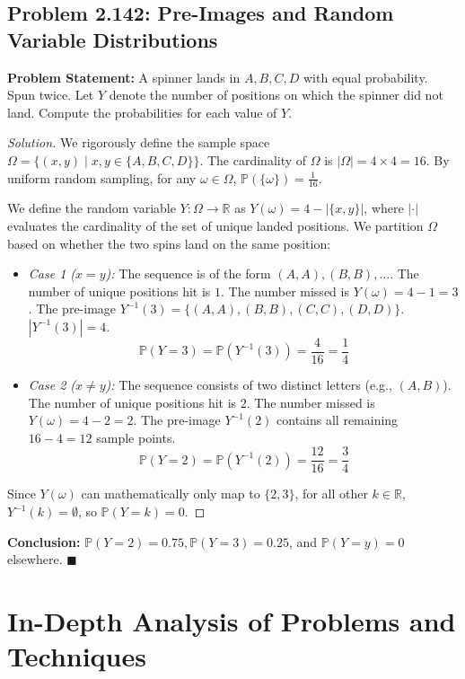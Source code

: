 \documentclass[11pt]{article}
\theoremstyle{definition}
\theoremstyle{plain}
\theoremstyle{remark}
\newcommand{\R}{\mathbb{R}}
\renewcommand{\P}{\mathbb{P}}
\newcommand{\1}{\mathbf{1}}
\begin{document}
\subsection{Problem 2.142: Pre-Images and Random Variable Distributions}
\textbf{Problem Statement:}
A spinner lands in $A, B, C, D$ with equal probability. Spun twice. Let $Y$ denote the number of positions on which the spinner did not land. Compute the probabilities for each value of $Y$.

\begin{proof}[Solution]
We rigorously define the sample space $\Omega = \{ (x, y) \mid x, y \in \{A, B, C, D\} \}$. 
The cardinality of $\Omega$ is $|\Omega| = 4 \times 4 = 16$. 
By uniform random sampling, for any $\omega \in \Omega$, $\P(\{\omega\}) = \frac{1}{16}$.

We define the random variable $Y: \Omega \to \R$ as $Y(\omega) = 4 - |\{x, y\}|$, where $|\cdot|$ evaluates the cardinality of the set of unique landed positions.
We partition $\Omega$ based on whether the two spins land on the same position:
\begin{itemize}
    \item \textit{Case 1 ($x=y$):} The sequence is of the form $(A,A), (B,B), \dots$. The number of unique positions hit is $1$. The number missed is $Y(\omega) = 4 - 1 = 3$. 
    The pre-image $Y^{-1}(3) = \{ (A,A), (B,B), (C,C), (D,D) \}$.
    $|Y^{-1}(3)| = 4$.
    \[ \P(Y = 3) = \P(Y^{-1}(3)) = \frac{4}{16} = \frac{1}{4} \]
    
    \item \textit{Case 2 ($x \neq y$):} The sequence consists of two distinct letters (e.g., $(A,B)$). The number of unique positions hit is $2$. The number missed is $Y(\omega) = 4 - 2 = 2$.
    The pre-image $Y^{-1}(2)$ contains all remaining $16 - 4 = 12$ sample points.
    \[ \P(Y = 2) = \P(Y^{-1}(2)) = \frac{12}{16} = \frac{3}{4} \]
\end{itemize}
Since $Y(\omega)$ can mathematically only map to $\{2, 3\}$, for all other $k \in \R$, $Y^{-1}(k) = \emptyset$, so $\P(Y=k) = 0$.
\end{proof}
\textbf{Conclusion:} $\P(Y=2) = 0.75, \P(Y=3) = 0.25$, and $\P(Y=y)=0$ elsewhere. $\blacksquare$

\section{In-Depth Analysis of Problems and Techniques}
\end{document}
